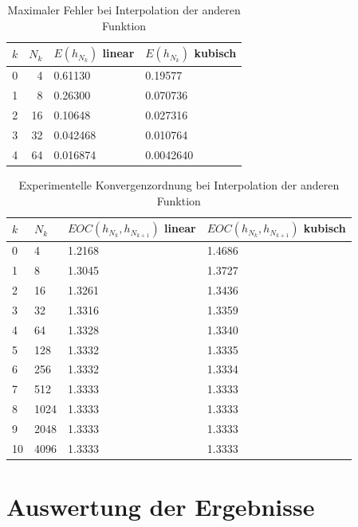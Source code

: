 \documentclass[a4paper, 11pt, ngerman]{scrartcl}
\begin{document}
\begin{table}[h]
	\centering
	\begin{tabular}{cr|l|l}
		\hline
		$k$ & $N_k$ & $E(h_{N_k})$ linear & $E(h_{N_k})$ kubisch\\
		\hline
		0 & 4 & 0.61130 & 0.19577 \\
		\hline
		1 & 8 & 0.26300 & 0.070736 \\
		\hline 
		2 & 16 & 0.10648 & 0.027316 \\
		\hline 
		3 & 32 & 0.042468 & 0.010764 \\
		\hline 
		4 & 64 & 0.016874 & 0.0042640 \\
		\hline
	\end{tabular}
	\caption{Maximaler Fehler bei Interpolation der anderen Funktion}
	\label{tab: gfehlermax}
\end{table}

\begin{table}[h]
	\centering
	\begin{tabular}{ll|l|l}
		\hline
		$k$ & $N_k$ & $EOC(h_{N_k},h_{N_{k+1}})$ linear & $EOC(h_{N_k},h_{N_{k+1}})$ kubisch\\
		\hline
		0 & 4 & 1.2168 & 1.4686  \\
		\hline
		1 & 8 & 1.3045 & 1.3727\\
		\hline
		2 & 16 & 1.3261 & 1.3436 \\
		\hline
		3 & 32 & 1.3316 & 1.3359 \\
		\hline
		4 & 64 & 1.3328 & 1.3340 \\
		\hline
		5 & 128 & 1.3332 & 1.3335 \\
		\hline
		6 & 256 & 1.3332 & 1.3334 \\
		\hline
		7 & 512 & 1.3333 & 1.3333 \\
		\hline
		8 & 1024 & 1.3333 & 1.3333 \\
		\hline
		9 & 2048 & 1.3333 & 1.3333 \\
		\hline
		10 & 4096 & 1.3333 & 1.3333 \\
		\hline
	\end{tabular}
	\caption{Experimentelle Konvergenzordnung bei Interpolation der anderen Funktion}
	\label{tab: gfehlerexp}
\end{table}

\newpage

\section{Auswertung der Ergebnisse}
\end{document}
